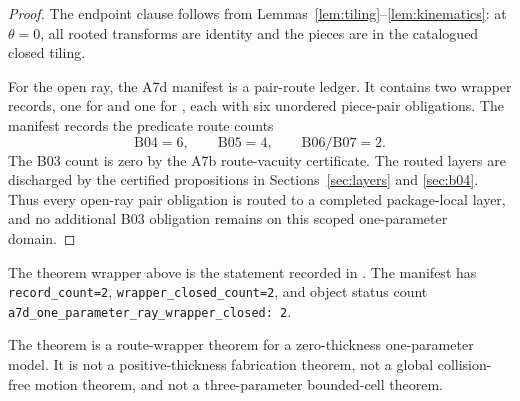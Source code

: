\begin{proof}
The endpoint clause follows from Lemmas~\ref{lem:tiling}--\ref{lem:kinematics}:
at \(\theta=0\), all rooted transforms are identity and the pieces are in the
catalogued closed tiling.

For the open ray, the A7d manifest is a pair-route ledger.  It contains two
wrapper records, one for \treeA{} and one for \treeB{}, each with six unordered
piece-pair obligations.  The manifest records the predicate route counts
\[
\text{B04}=6,
\qquad
\text{B05}=4,
\qquad
\text{B06/B07}=2.
\]
The B03 count is zero by the A7b route-vacuity certificate.  The routed layers
are discharged by the certified propositions in Sections~\ref{sec:layers} and
\ref{sec:b04}.  Thus every open-ray pair obligation is routed to a completed
package-local layer, and no additional B03 obligation remains on this scoped
one-parameter domain.
\end{proof}

\begin{certprop}[A7d manifest]
The theorem wrapper above is the statement recorded in
.  The manifest
has \texttt{record\_count=2}, \texttt{wrapper\_closed\_count=2}, and object
status count
\texttt{a7d\_one\_parameter\_ray\_wrapper\_closed: 2}.
\end{certprop}

\begin{remark}[Scope]
The theorem is a route-wrapper theorem for a zero-thickness one-parameter model.
It is not a positive-thickness fabrication theorem, not a global collision-free
motion theorem, and not a three-parameter bounded-cell theorem.
\end{remark}
